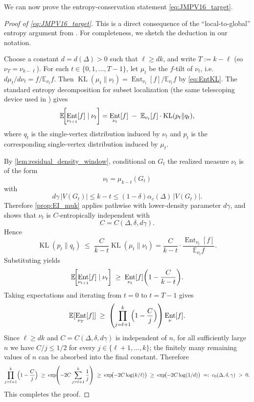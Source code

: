 \documentclass[11pt,reqno,letterpaper]{amsart}
\numberwithin{equation}{section}
\theoremstyle{definition}
\DeclareMathOperator{\Ent}{Ent}
\newcommand{\KL}{\operatorname{KL}}
\let\originalleft\left
\let\originalright\right
\renewcommand{\left}{\mathopen{}\mathclose\bgroup\originalleft}
\renewcommand{\right}{\aftergroup\egroup\originalright}
\begin{document}
We can now prove the entropy-conservation statement \cref{eq:JMPV16_target}. 



\begin{proof}[Proof of \cref{eq:JMPV16_target}]
This is a direct consequence of the ``local-to-global'' entropy  argument from
\cite[Appendix~B]{anari2021entropic}. 
For completeness, we sketch the deduction in our notation.

Choose a constant $d=d(\Delta)>0$ such that $\ell \ge dk$, and write $T:=k-\ell$
(so $\nu_T=\nu_{k-\ell}$).
For each $t\in\{0,1,\dots,T-1\}$, let $\mu_t$ be the $f$-tilt of $\nu_t$, i.e.
$d\mu_t/d\nu_t=f/\mathbb{E}_{\nu_t}f$.
Then $\KL(\mu_t\|\nu_t)=\Ent_{\nu_t}[f]/\mathbb{E}_{\nu_t}f$ by \eqref{eq:EntKL}.
The standard entropy decomposition for subset localization (the same telescoping device used in
\cite[Appendix~B]{anari2021entropic}) gives
\[
\mathbb{E}\!\left[\Ent_{\nu_{t+1}}[f]\mid \nu_t\right]
=
\Ent_{\nu_t}[f]\;-\;\mathbb{E}_{\nu_t}[f]\cdot \KL(p_t\|q_t),
\]
where $q_t$ is the single-vertex distribution induced by $\nu_t$ and $p_t$ is the corresponding
single-vertex distribution induced by $\mu_t$.

By \cref{lem:residual_density_window}, conditional on $G_t$ the realized measure $\nu_t$ is of the form
\[
\nu_t=\mu_{k-t}(G_t)
\]
with
\[
d\gamma\,|V(G_t)| \le k-t \le (1-\delta)\alpha_c(\Delta)\,|V(G_t)|.
\]
Therefore \cref{prop:EI_muk} applies pathwise with lower-density parameter $d\gamma$, and shows that
$\nu_t$ is $C$-entropically independent with
\[
C=C(\Delta,\delta,d\gamma).
\]
Hence
\[
\KL(p_t\|q_t)\;\le\;\frac{C}{k-t}\KL(\mu_t\|\nu_t)
=\frac{C}{k-t}\cdot \frac{\Ent_{\nu_t}[f]}{\mathbb{E}_{\nu_t}f}.
\]
Substituting yields
\[
\mathbb{E}\!\left[\Ent_{\nu_{t+1}}[f]\mid \nu_t\right]
\;\ge\;
\Ent_{\nu_t}[f]\left(1-\frac{C}{k-t}\right).
\]
Taking expectations and iterating from $t=0$ to $t=T-1$ gives
\[
\mathbb{E}[\Ent_{\nu_T}[f]]
\;\ge\;
\left(\prod_{j=\ell+1}^{k}\Bigl(1-\frac{C}{j}\Bigr)\right)\Ent_\nu[f].
\]
Since $\ell\geq dk$ and $C=C(\Delta,\delta,d\gamma)$ is independent of $n$, for all sufficiently
large $n$ we have $C/j\le 1/2$ for every $j\in\{\ell+1,\dots,k\}$; the finitely many remaining
values of $n$ can be absorbed into the final constant. Therefore
\[
\prod_{j=\ell+1}^{k}\Bigl(1-\frac{C}{j}\Bigr)
\;\ge\;
\exp\!\left(-2C\sum_{j=\ell+1}^{k}\frac1j\right)
\;\ge\;
\exp\!\bigl(-2C\log(k/\ell)\bigr)
\;\ge\;
\exp\!\bigl(-2C\log(1/d)\bigr)
\;=:\;
c_0(\Delta,\delta,\gamma)
\;>\;0.
\]
This completes the proof.

\end{proof}




\end{document}
